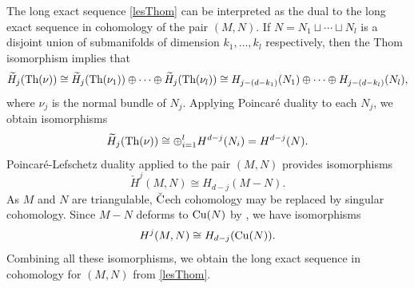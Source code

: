 \begin{rem}
    The long exact sequence \eqref{lesThom} can be interpreted as the dual to the long exact sequence in cohomology of the pair $(M,N)$. If $N=N_1\sqcup \cdots\sqcup N_l$ is a disjoint union of submanifolds of dimension $k_1, \ldots, k_l$ respectively, then the Thom isomorphism implies that 
    \begin{displaymath}
        \widetilde{H}_j(\textup{Th}(\nu))\cong \widetilde{H}_j(\textup{Th}(\nu_1))\oplus \cdots\oplus \widetilde{H}_j(\textup{Th}(\nu_l))\cong H_{j-(d-k_1)}(N_1)\oplus\cdots\oplus H_{j-(d-k_l)}(N_l),
    \end{displaymath}
    where $\nu_j$ is the normal bundle of $N_j$. Applying Poincar\'{e} duality to each $N_j$, we obtain isomorphisms
    \begin{displaymath}
        \widetilde{H}_j(\textup{Th}(\nu))\cong \oplus_{i=1}^l H^{d-j}(N_i)= H^{d-j}(N).
    \end{displaymath}
    Poincar\'{e}-Lefschetz duality applied to the pair $(M,N)$ provides isomorphisms
    \begin{equation}\label{MNcutn}
        \check{H}^j(M,N)\cong H_{d-j}(M-N).
    \end{equation}
    As $M$ and $N$ are triangulable, $\check{\textup{C}}$ech cohomology may be replaced by singular cohomology. Since $M-N$ deforms to $\mathrm{Cu}(N)$ by , we have isomorphisms
    \begin{equation}\label{MNcutn2}
        H^j(M,N)\cong H_{d-j}(\mathrm{Cu}(N)).
    \end{equation}
    Combining all these isomorphisms, we obtain the long exact sequence in cohomology for $(M,N)$ from \eqref{lesThom}. 
\end{rem}

